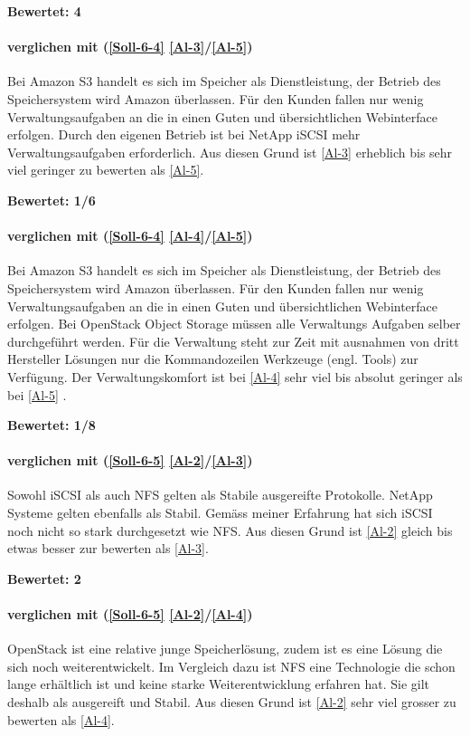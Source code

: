 \textbf{Bewertet: 4}


\paragraph*{  verglichen mit  (\ref{Soll-6-4} \ref{Al-3}/\ref{Al-5})}
Bei Amazon S3 handelt es sich im Speicher als Dienstleistung, der Betrieb des Speichersystem wird Amazon überlassen. Für den Kunden fallen nur wenig Verwaltungsaufgaben an die in einen Guten und übersichtlichen Webinterface erfolgen. Durch den eigenen Betrieb ist bei NetApp iSCSI mehr Verwaltungsaufgaben erforderlich. Aus diesen Grund ist  \ref{Al-3} erheblich bis sehr viel geringer zu bewerten als  \ref{Al-5}.

\textbf{Bewertet: 1/6}


\paragraph*{  verglichen mit  (\ref{Soll-6-4} \ref{Al-4}/\ref{Al-5})}
Bei Amazon S3 handelt es sich im Speicher als Dienstleistung, der Betrieb des Speichersystem wird Amazon überlassen. Für den Kunden fallen nur wenig Verwaltungsaufgaben an die in einen Guten und übersichtlichen Webinterface erfolgen. Bei OpenStack Object Storage müssen alle Verwaltungs Aufgaben selber durchgeführt werden. Für die Verwaltung steht zur Zeit mit ausnahmen von dritt Hersteller Lösungen nur die Kommandozeilen Werkzeuge (engl. Tools) zur Verfügung. Der Verwaltungskomfort ist bei  \ref{Al-4} sehr viel bis absolut geringer als bei \ref{Al-5} .

\textbf{Bewertet: 1/8}


\paragraph*{  verglichen mit  (\ref{Soll-6-5} \ref{Al-2}/\ref{Al-3})}
Sowohl iSCSI als auch NFS gelten als Stabile ausgereifte Protokolle. NetApp Systeme gelten ebenfalls als Stabil. Gemäss meiner Erfahrung hat sich iSCSI noch nicht so stark durchgesetzt wie NFS. Aus diesen Grund ist  \ref{Al-2} gleich bis etwas besser zur bewerten als  \ref{Al-3}.

\textbf{Bewertet: 2}

\paragraph*{  verglichen mit  (\ref{Soll-6-5} \ref{Al-2}/\ref{Al-4})}
OpenStack ist eine relative junge Speicherlösung, zudem ist es eine Lösung die sich noch weiterentwickelt. Im Vergleich dazu ist NFS eine Technologie die schon lange erhältlich ist und keine starke Weiterentwicklung erfahren hat. Sie gilt deshalb als ausgereift und Stabil.
Aus diesen Grund ist  \ref{Al-2} sehr viel grosser zu bewerten als  \ref{Al-4}.

